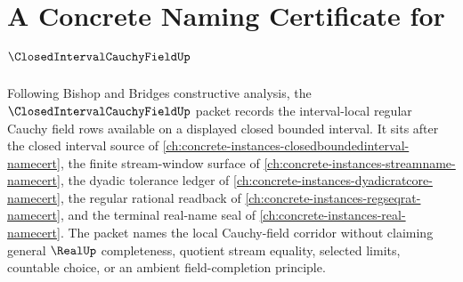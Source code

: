 \chapter{A Concrete Naming Certificate for $\ClosedIntervalCauchyFieldUp$}
\label{ch:concrete-instances-closed-interval-cauchy-field-namecert}

Following Bishop and Bridges constructive analysis, the $\ClosedIntervalCauchyFieldUp$ packet records the interval-local regular Cauchy field rows available on a displayed closed bounded interval. It sits after the closed interval source of \autoref{ch:concrete-instances-closedboundedinterval-namecert}, the finite stream-window surface of \autoref{ch:concrete-instances-streamname-namecert}, the dyadic tolerance ledger of \autoref{ch:concrete-instances-dyadicratcore-namecert}, the regular rational readback of \autoref{ch:concrete-instances-regseqrat-namecert}, and the terminal real-name seal of \autoref{ch:concrete-instances-real-namecert}. The packet names the local Cauchy-field corridor without claiming general $\RealUp$ completeness, quotient stream equality, selected limits, countable choice, or an ambient field-completion principle.

